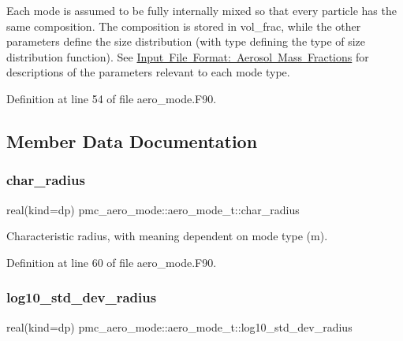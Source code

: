 Each mode is assumed to be fully internally mixed so that every particle has the same composition. The composition is stored in {\ttfamily vol\+\_\+frac}, while the other parameters define the size distribution (with {\ttfamily type} defining the type of size distribution function). See \mbox{\hyperlink{input_format_mass_frac}{Input File Format\+: Aerosol Mass Fractions}} for descriptions of the parameters relevant to each mode type. 

Definition at line 54 of file aero\+\_\+mode.\+F90.



\subsection{Member Data Documentation}
\mbox{\label{structpmc__aero__mode_1_1aero__mode__t_a06669595ee6345caf6b7b4c39aa91fd6}} 
\subsubsection{\texorpdfstring{char\+\_\+radius}{char\_radius}}
{\footnotesize\ttfamily real(kind=dp) pmc\+\_\+aero\+\_\+mode\+::aero\+\_\+mode\+\_\+t\+::char\+\_\+radius}



Characteristic radius, with meaning dependent on mode type (m). 



Definition at line 60 of file aero\+\_\+mode.\+F90.

\mbox{\label{structpmc__aero__mode_1_1aero__mode__t_a365f9259ec7d4dd6c5a263b4f705b8e0}} 
\subsubsection{\texorpdfstring{log10\+\_\+std\+\_\+dev\+\_\+radius}{log10\_std\_dev\_radius}}
{\footnotesize\ttfamily real(kind=dp) pmc\+\_\+aero\+\_\+mode\+::aero\+\_\+mode\+\_\+t\+::log10\+\_\+std\+\_\+dev\+\_\+radius}



